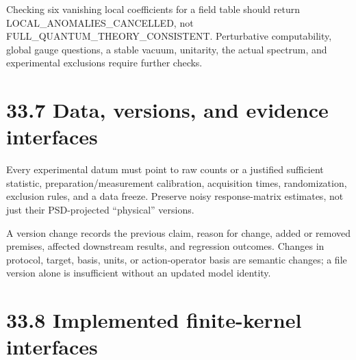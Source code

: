 \documentclass[
  11pt,
  oneside]{book}
\begin{document}
Checking six vanishing local coefficients for a field table should
return LOCAL\_\allowbreak ANOMALIES\_\allowbreak CANCELLED, not
FULL\_\allowbreak QUANTUM\_\allowbreak THEORY\_\allowbreak CONSISTENT. Perturbative computability, global
gauge questions, a stable vacuum, unitarity, the actual spectrum, and
experimental exclusions require further checks.

\section{33.7 Data, versions, and evidence interfaces}

Every experimental datum must point to raw counts or a justified
sufficient statistic, preparation/measurement calibration, acquisition
times, randomization, exclusion rules, and a data freeze. Preserve noisy
response-matrix estimates, not just their PSD-projected ``physical''
versions.

A version change records the previous claim, reason for change, added or
removed premises, affected downstream results, and regression outcomes.
Changes in protocol, target, basis, units, or action-operator basis are
semantic changes; a file version alone is insufficient without an
updated model identity.

\section{33.8 Implemented finite-kernel interfaces}
\end{document}
